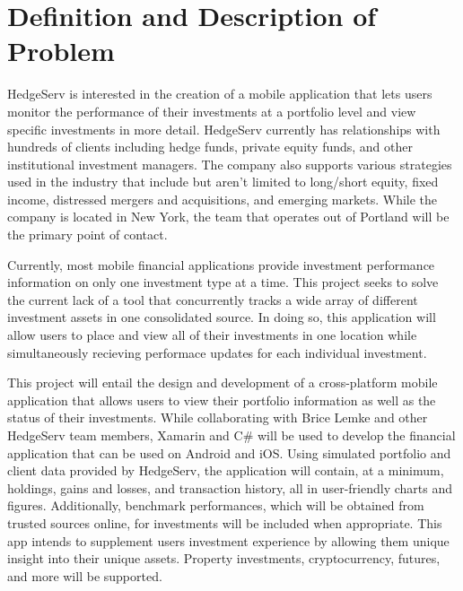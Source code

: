 \documentclass[onecolumn, draftclsnofoot,10pt, compsoc]{IEEEtran}
\begin{document}
\newpage
{}
\tableofcontents
\clearpage

\section{Definition and Description of Problem}

HedgeServ is interested in the creation of a mobile application that lets users monitor the performance of their investments at a portfolio level and view specific investments in more detail. HedgeServ currently has relationships with hundreds of clients including hedge funds, private equity funds, and other institutional investment managers. The company also supports various strategies used in the industry that include but aren’t limited to long/short equity, fixed income, distressed mergers and acquisitions, and emerging markets. While the company is located in New York, the team that operates out of Portland will be the primary point of contact.

Currently, most mobile financial applications provide investment performance information on only one investment type at a time. This project seeks to solve the current lack of a tool that concurrently tracks a wide array of different investment assets in one consolidated source. In doing so, this application will allow users to place and view all of their investments in one location while simultaneously recieving performace updates for each individual investment.

This project will entail the design and development of a cross-platform mobile application that allows users to view their portfolio information as well as the status of their investments. While collaborating with Brice Lemke and other HedgeServ team members, Xamarin and C\# will be used to develop the financial application that can be used on Android and iOS. Using simulated portfolio and client data provided by HedgeServ, the application will contain, at a minimum, holdings, gains and losses, and transaction history, all in user-friendly charts and figures. Additionally, benchmark performances, which will be obtained from trusted sources online, for investments will be included when appropriate. This app intends to supplement users investment experience by allowing them unique insight into their unique assets. Property investments, cryptocurrency, futures, and more will be supported.
\end{document}

